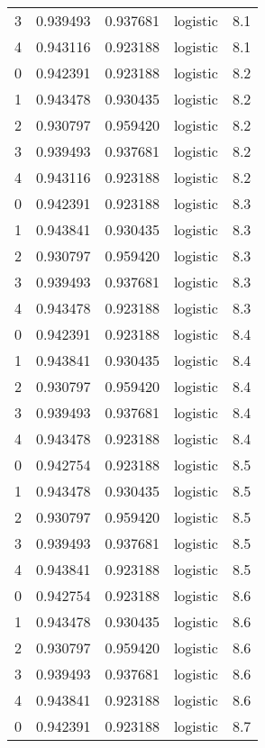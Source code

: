 \begin{tabular}{rrrlr}
     3 & 0.939493 & 0.937681 & logistic &        8.1 \\
     4 & 0.943116 & 0.923188 & logistic &        8.1 \\
     0 & 0.942391 & 0.923188 & logistic &        8.2 \\
     1 & 0.943478 & 0.930435 & logistic &        8.2 \\
     2 & 0.930797 & 0.959420 & logistic &        8.2 \\
     3 & 0.939493 & 0.937681 & logistic &        8.2 \\
     4 & 0.943116 & 0.923188 & logistic &        8.2 \\
     0 & 0.942391 & 0.923188 & logistic &        8.3 \\
     1 & 0.943841 & 0.930435 & logistic &        8.3 \\
     2 & 0.930797 & 0.959420 & logistic &        8.3 \\
     3 & 0.939493 & 0.937681 & logistic &        8.3 \\
     4 & 0.943478 & 0.923188 & logistic &        8.3 \\
     0 & 0.942391 & 0.923188 & logistic &        8.4 \\
     1 & 0.943841 & 0.930435 & logistic &        8.4 \\
     2 & 0.930797 & 0.959420 & logistic &        8.4 \\
     3 & 0.939493 & 0.937681 & logistic &        8.4 \\
     4 & 0.943478 & 0.923188 & logistic &        8.4 \\
     0 & 0.942754 & 0.923188 & logistic &        8.5 \\
     1 & 0.943478 & 0.930435 & logistic &        8.5 \\
     2 & 0.930797 & 0.959420 & logistic &        8.5 \\
     3 & 0.939493 & 0.937681 & logistic &        8.5 \\
     4 & 0.943841 & 0.923188 & logistic &        8.5 \\
     0 & 0.942754 & 0.923188 & logistic &        8.6 \\
     1 & 0.943478 & 0.930435 & logistic &        8.6 \\
     2 & 0.930797 & 0.959420 & logistic &        8.6 \\
     3 & 0.939493 & 0.937681 & logistic &        8.6 \\
     4 & 0.943841 & 0.923188 & logistic &        8.6 \\
     0 & 0.942391 & 0.923188 & logistic &        8.7 \\

\end{tabular}
